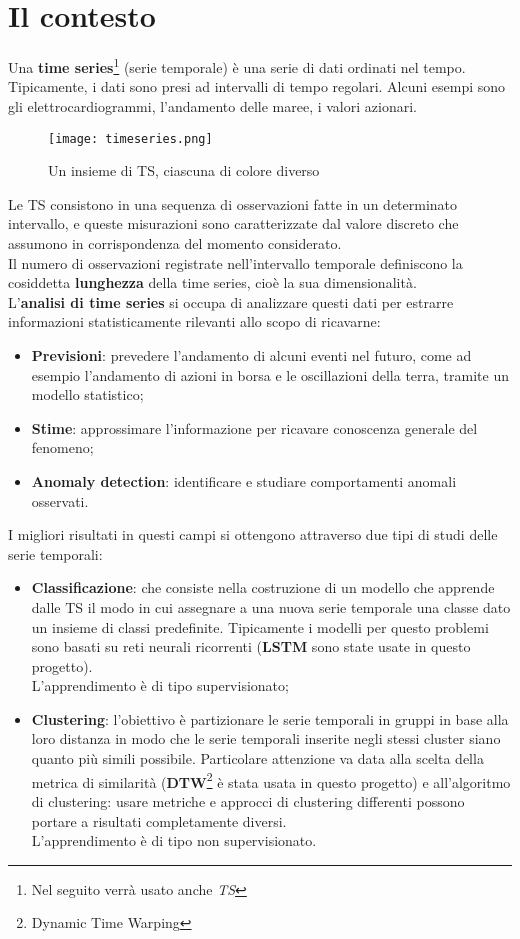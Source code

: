 \section{Il contesto}
Una \textbf{time series}\footnote{Nel seguito verrà usato anche \textit{TS}} (serie temporale) è una serie di dati ordinati nel tempo. Tipicamente, i dati sono presi ad intervalli di tempo regolari. Alcuni esempi sono gli elettrocardiogrammi, l'andamento delle maree, i valori azionari.
\begin{figure}[H]
	\centering
	\texttt{[image: timeseries.png]}
	\caption{Un insieme di TS, ciascuna di colore diverso}
	\label{fig:timeseries}
\end{figure}
Le TS consistono in una sequenza di osservazioni fatte in un determinato intervallo, e queste misurazioni sono caratterizzate dal valore discreto che assumono in corrispondenza del momento considerato.\\
Il numero di osservazioni registrate nell'intervallo temporale definiscono la cosiddetta \textbf{lunghezza} della time series, cioè la sua dimensionalità.
\\
L'\textbf{analisi di time series} si occupa di analizzare questi dati per estrarre informazioni statisticamente rilevanti allo scopo di ricavarne:
\begin{itemize}
	\item \textbf{Previsioni}: prevedere l'andamento di alcuni eventi nel futuro, come ad esempio l'andamento di azioni in borsa e le oscillazioni della terra, tramite un modello statistico;
	\item \textbf{Stime}: approssimare l'informazione per ricavare conoscenza generale del fenomeno;
	\item \textbf{Anomaly detection}: identificare e studiare comportamenti anomali osservati.
\end{itemize}
I migliori risultati in questi campi si ottengono attraverso due tipi di studi delle serie temporali:
\begin{itemize}
	\item \textbf{Classificazione}: che consiste nella costruzione di un modello che apprende dalle TS il modo in cui assegnare a una nuova serie temporale una classe dato un insieme di classi predefinite. Tipicamente i modelli per questo problemi sono basati su reti neurali ricorrenti (\textbf{LSTM} sono state usate in questo progetto). 
	\\L'apprendimento è di tipo supervisionato;
	\item \textbf{Clustering}: l'obiettivo è partizionare le serie temporali in gruppi in base alla loro distanza in modo che le serie temporali inserite negli stessi cluster siano quanto più simili possibile. Particolare attenzione va data alla scelta della metrica di similarità (\textbf{DTW}\footnote{Dynamic Time Warping} è stata usata in questo progetto) e all'algoritmo di clustering: usare metriche e approcci di clustering differenti possono portare a risultati completamente diversi. 
	\\L'apprendimento è di tipo non supervisionato.
\end{itemize}
